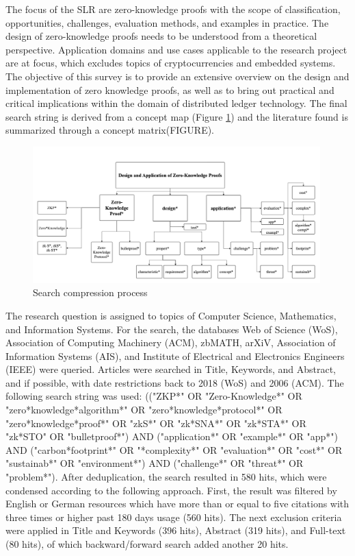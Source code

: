 The focus of the SLR are zero-knowledge proofs with the scope of classification, opportunities, challenges, evaluation methods, and examples in practice. The design of zero-knowledge proofs needs to be understood from a theoretical perspective. Application domains and use cases applicable to the research project are at focus, which excludes topics of cryptocurrencies and embedded systems. The objective of this survey is to provide an extensive overview on the design and implementation of zero knowledge proofs, as well as to bring out practical and critical implications within the domain of distributed ledger technology. The final search string is derived from a concept map (Figure \ref{fig:concept_map}) and the literature found is summarized through a concept matrix(FIGURE). 

\begin{figure}[hbt]
	\centering
		\includegraphics[width=0.99\textwidth]{Pictures/concept map.png}
	\caption{Search compression process}
	\label{fig:concept_map}
\end{figure}

The research question is assigned to topics of Computer Science, Mathematics, and Information Systems. For the search, the databases Web of Science (WoS), Association of Computing Machinery (ACM), zbMATH, arXiV, Association of Information Systems (AIS), and Institute of Electrical and Electronics Engineers (IEEE) were queried. Articles were searched in Title, Keywords, and Abstract, and if possible, with date restrictions back to 2018 (WoS) and 2006 (ACM). The following search string was used: (("ZKP*" OR "Zero-Knowledge*" OR "zero*knowledge*algorithm*" OR "zero*knowledge*protocol*" OR "zero*knowledge*proof*" OR "zkS*" OR "zk*SNA*" OR "zk*STA*" OR "zk*STO" OR "bulletproof*") AND ("application*" OR "example*" OR "app*") AND ("carbon*footprint*" OR "*complexity*" OR "evaluation*" OR "cost*" OR "sustainab*" OR "environment*") AND ("challenge*" OR "threat*" OR "problem*"). After deduplication, the search resulted in 580 hits, which were condensed according to the following approach. First, the result was filtered by English or German resources which have more than or equal to five citations with three times or higher past 180 days usage (560 hits). The next exclusion criteria were applied in Title and Keywords (396 hits), Abstract (319 hits), and Full-text (80 hits), of which backward/forward search added another 20 hits. 

